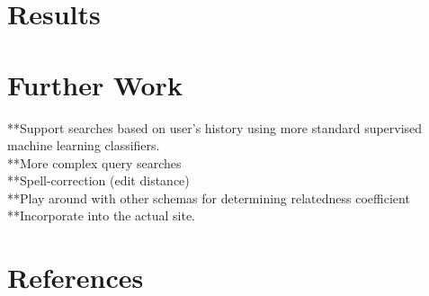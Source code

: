 \documentclass[12pt]{article}
\begin{document}
\section*{Results}
	
\section*{Further Work}
**Support searches based on user's history using more standard supervised machine learning classifiers.\\
	**More complex query searches\\
	**Spell-correction (edit distance)\\
	**Play around with other schemas for determining relatedness coefficient\\
	**Incorporate into the actual site.\\

\section*{References}
\end{document}
